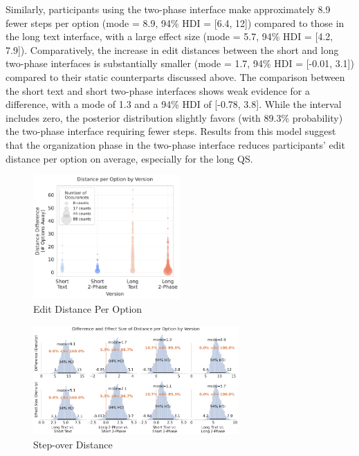 Similarly, participants using the two-phase interface make approximately 8.9 fewer steps per option (mode = 8.9, 94\% HDI = [6.4, 12]) compared to those in the long text interface, with a large effect size (mode = 5.7, 94\% HDI = [4.2, 7.9]). Comparatively, the increase in edit distances between the short and long two-phase interfaces is substantially smaller (mode = 1.7, 94\% HDI = [-0.01, 3.1]) compared to their static counterparts discussed above. The comparison between the short text and short two-phase interfaces shows weak evidence for a difference, with a mode of 1.3 and a 94\% HDI of [-0.78, 3.8]. While the interval includes zero, the posterior distribution slightly favors (with 89.3\% probability) the two-phase interface requiring fewer steps. Results from this model suggest that the organization phase in the two-phase interface reduces participants' edit distance per option on average, especially for the long QS.

\begin{figure}[ht]
    \centering
    \includegraphics[width=0.5\textwidth]{content/image/distance/distance_diff_by_version.pdf}
    \caption{Edit Distance Per Option}
    \label{fig:dist_per_option}
\end{figure}

\begin{figure}[ht]
    \centering
    \includegraphics[width=0.7\textwidth]{content/image/distance/distance_diff_per_option_effect_size_by_version.pdf}
    \caption{Step-over Distance}
    \label{fig:dist_per_option_bayesian}
\end{figure}

